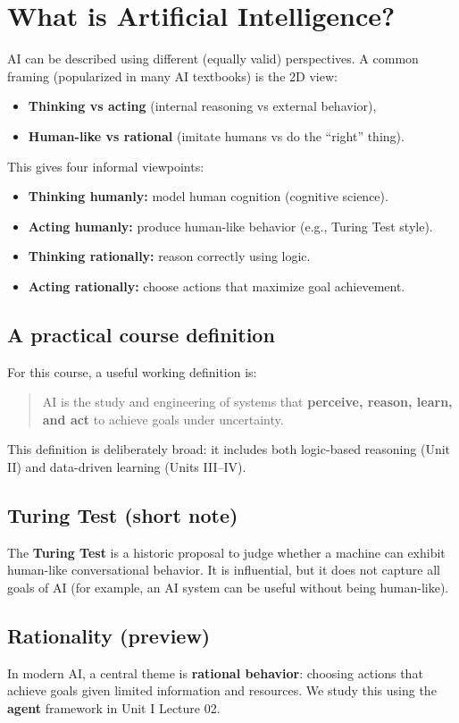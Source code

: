 \documentclass[11pt]{article}
\begin{document}
\section{What is Artificial Intelligence?}
AI can be described using different (equally valid) perspectives. A common framing (popularized in many AI textbooks) is the 2D view:
\begin{itemize}[leftmargin=*]
  \item \textbf{Thinking vs acting} (internal reasoning vs external behavior),
  \item \textbf{Human-like vs rational} (imitate humans vs do the ``right'' thing).
\end{itemize}
This gives four informal viewpoints:
\begin{itemize}[leftmargin=*]
  \item \textbf{Thinking humanly:} model human cognition (cognitive science).
  \item \textbf{Acting humanly:} produce human-like behavior (e.g., Turing Test style).
  \item \textbf{Thinking rationally:} reason correctly using logic.
  \item \textbf{Acting rationally:} choose actions that maximize goal achievement.
\end{itemize}

\subsection{A practical course definition}
For this course, a useful working definition is:
\begin{quote}
AI is the study and engineering of systems that \textbf{perceive, reason, learn, and act} to achieve goals under uncertainty.
\end{quote}
This definition is deliberately broad: it includes both logic-based reasoning (Unit II) and data-driven learning (Units III--IV).

\subsection{Turing Test (short note)}
The \textbf{Turing Test} is a historic proposal to judge whether a machine can exhibit human-like conversational behavior.
It is influential, but it does not capture all goals of AI (for example, an AI system can be useful without being human-like).

\subsection{Rationality (preview)}
In modern AI, a central theme is \textbf{rational behavior}: choosing actions that achieve goals given limited information and resources.
We study this using the \textbf{agent} framework in Unit I Lecture 02.
\end{document}
